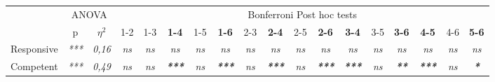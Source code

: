 \begin{sidewaystable}[h]
    \center
        \begin{tabular}{c|cc|ccccccccccccccc|}
        \cline{2-18}
        \multicolumn{1}{l|}{}                        & \multicolumn{2}{c|}{ANOVA}                                 & \multicolumn{15}{c|}{Bonferroni Post hoc tests}                                                                                                                                                                                                                                                                                                                                                                                                                                                                                                                                                                        \\ \cline{2-18} 
        \multicolumn{1}{l|}{}                        & \multicolumn{1}{c|}{p}            & $\eta^2$               & \multicolumn{1}{c|}{1-2}         & \multicolumn{1}{c|}{1-3}         & \multicolumn{1}{c|}{\textbf{1-4}}          & \multicolumn{1}{c|}{1-5}                  & \multicolumn{1}{c|}{\textbf{1-6}}          & \multicolumn{1}{c|}{2-3}         & \multicolumn{1}{c|}{\textbf{2-4}}          & \multicolumn{1}{c|}{2-5}         & \multicolumn{1}{c|}{\textbf{2-6}}          & \multicolumn{1}{c|}{\textbf{3-4}}          & \multicolumn{1}{c|}{3-5}                 & \multicolumn{1}{c|}{\textbf{3-6}}          & \multicolumn{1}{c|}{\textbf{4-5}}          & \multicolumn{1}{c|}{4-6}         & \textbf{5-6}          \\ \hline
        \multicolumn{1}{|c|}{Responsive}             & \multicolumn{1}{c|}{\textit{***}} & \textit{0,16}          & \multicolumn{1}{c|}{\textit{ns}} & \multicolumn{1}{c|}{\textit{ns}} & \multicolumn{1}{c|}{\textit{ns}}           & \multicolumn{1}{c|}{\textit{ns}}          & \multicolumn{1}{c|}{\textit{ns}}           & \multicolumn{1}{c|}{\textit{ns}} & \multicolumn{1}{c|}{\textit{ns}}           & \multicolumn{1}{c|}{\textit{ns}} & \multicolumn{1}{c|}{\textit{ns}}           & \multicolumn{1}{c|}{\textit{ns}}           & \multicolumn{1}{c|}{\textit{ns}}         & \multicolumn{1}{c|}{\textit{ns}}           & \multicolumn{1}{c|}{\textit{ns}}           & \multicolumn{1}{c|}{\textit{ns}} & \textit{ns}           \\ \hline
        \multicolumn{1}{|c|}{Competent}              & \multicolumn{1}{c|}{\textit{***}} & \textit{0,49}          & \multicolumn{1}{c|}{\textit{ns}} & \multicolumn{1}{c|}{\textit{ns}} & \multicolumn{1}{c|}{\textit{\textbf{***}}} & \multicolumn{1}{c|}{\textit{ns}}          & \multicolumn{1}{c|}{\textit{\textbf{***}}} & \multicolumn{1}{c|}{\textit{ns}} & \multicolumn{1}{c|}{\textit{\textbf{***}}} & \multicolumn{1}{c|}{\textit{ns}} & \multicolumn{1}{c|}{\textit{\textbf{***}}} & \multicolumn{1}{c|}{\textit{\textbf{***}}} & \multicolumn{1}{c|}{\textit{ns}}         & \multicolumn{1}{c|}{\textit{\textbf{**}}}  & \multicolumn{1}{c|}{\textit{\textbf{***}}} & \multicolumn{1}{c|}{\textit{ns}} & \textit{\textbf{*}}   \\ \hline

\end{tabular}
\end{sidewaystable}
